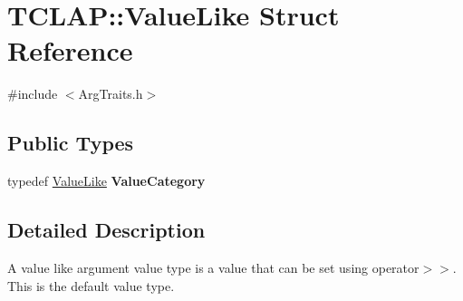 \hypertarget{struct_t_c_l_a_p_1_1_value_like}{\section{T\-C\-L\-A\-P\-:\-:Value\-Like Struct Reference}
\label{struct_t_c_l_a_p_1_1_value_like}
}


{\ttfamily \#include $<$Arg\-Traits.\-h$>$}

\subsection*{Public Types}
\begin{DoxyCompactItemize}
\item 
\hypertarget{struct_t_c_l_a_p_1_1_value_like_a26e6d3b8c4a608ecebe7404e42fbecf9}{typedef \hyperlink{struct_t_c_l_a_p_1_1_value_like}{Value\-Like} {\bfseries Value\-Category}}\label{struct_t_c_l_a_p_1_1_value_like_a26e6d3b8c4a608ecebe7404e42fbecf9}

\end{DoxyCompactItemize}


\subsection{Detailed Description}
A value like argument value type is a value that can be set using operator$>$$>$. This is the default value type. 